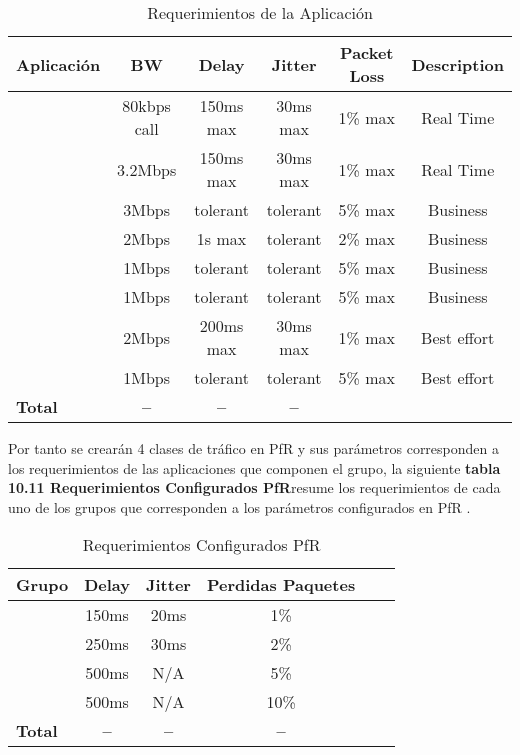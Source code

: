 \begin{table}[ht]
	\caption{\footnotesize{Requerimientos de la Aplicación}}
	\label{tab:hla:results}
\centering
\begin{tabular}{lccccc}
	\toprule
	\multicolumn{1}{c}{\textbf{Aplicación}} 	& \textbf{BW}	& \textbf{Delay}	& \textbf{Jitter} 	& \textbf{Packet Loss} & \textbf{Description}\\
	\midrule
\cite{Telefonia} 		& 80kbps call & 150ms max & 30ms max	& 1\% max & Real Time\\
\cite{Videoconferencia} & 3.2Mbps & 150ms max & 30ms max & 1\% max & Real Time\\
\cite{FTP} 		& 3Mbps & tolerant & tolerant& 5\% max & Business\\
\cite{CCTV} 		& 2Mbps & 1s max & tolerant	& 2\% max & Business\\
\cite{Web Privada} 		& 1Mbps & tolerant & tolerant & 5\% max & Business\\
\cite{Internet} 		& 1Mbps & tolerant & tolerant & 5\% max & Business\\
\cite{Escritorio remoto} & 2Mbps & 200ms max & 30ms max	& 1\% max & Best effort\\
\cite{Correo} & 1Mbps & tolerant & tolerant	& 5\% max & Best effort\\
	\midrule
	\textbf{Total}			& \textbf{--}		& \textbf{--}		& \textbf{--} \\
	\bottomrule
\end{tabular}
\end{table}
Por tanto se crearán 4 clases de tráfico en PfR y sus parámetros corresponden a los requerimientos de las aplicaciones que componen el grupo, la siguiente \textbf{tabla 10.11 Requerimientos Configurados PfR}resume los requerimientos de cada uno de los grupos que corresponden a los parámetros configurados en PfR .
\begin{table}[ht]
	\caption{Requerimientos Configurados PfR}
	\label{tab:hla:results}
\centering
\begin{tabular}{lccccc}
	\toprule
\multicolumn{1}{c}{\textbf{Grupo}} 	& \textbf{Delay}	& \textbf{Jitter}	& \textbf{Perdidas Paquetes}\\
	\midrule
\cite{Real-Time} 		& 150ms & 20ms & 1\% \\
\cite{Business-class} 		& 250ms & 30ms & 2\% \\
\cite{Best Effort} 		& 500ms & N/A & 5\% \\
\cite{Scavenger} 		& 500ms & N/A & 10\% \\
	\midrule
	\textbf{Total}			& \textbf{--}		& \textbf{--}		& \textbf{--} \\
	\bottomrule
\end{tabular}
\end{table}

